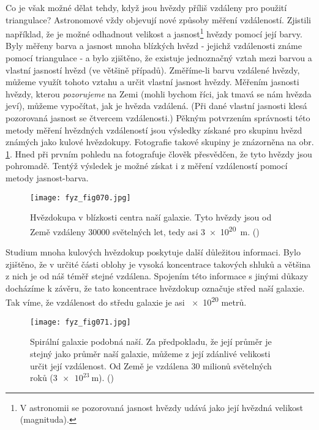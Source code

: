     Co je však možné dělat tehdy, když jsou hvězdy příliš vzdáleny pro použití triangulace? 
    Astronomové vždy objevují nové způsoby měření vzdáleností. Zjistili například, že je možné 
    odhadnout velikost a jasnost\footnote{V astronomii se pozorovaná jasnost hvězdy udává jako její 
    hvězdná velikost (magnituda).} hvězdy pomocí její barvy. Byly měřeny barva a jasnost mnoha 
    blízkých hvězd - jejichž vzdálenosti známe pomocí triangulace - a bylo zjištěno, že existuje 
    jednoznačný vztah mezi barvou a vlastní jasností hvězd (ve většině případů). Změříme-li barvu 
    vzdálené hvězdy, můžeme využít tohoto vztahu a určit vlastní jasnost hvězdy. Měřením jasnosti 
    hvězdy, kterou \emph{pozorujeme} na Zemi (mohli bychom říci, jak tmavá se nám hvězda jeví), 
    můžeme vypočítat, jak je hvězda vzdálená. (Při dané vlastní jasnosti klesá pozorovaná jasnost 
    se čtvercem vzdálenosti.) Pěkným potvrzením správnosti této metody měření hvězdných vzdáleností 
    jsou výsledky získané pro skupinu hvězd známých jako kulové hvězdokupy. Fotografie takové 
    skupiny je znázorněna na obr. \ref{fyz:fig070}. Hned při prvním pohledu na fotografuje člověk 
    přesvědčen, že tyto hvězdy jsou pohromadě. Tentýž výsledek je možné získat i z měření 
    vzdáleností pomocí metody jasnost-barva.

    \begin{figure}[ht!]  %
      \centering
      \texttt{[image: fyz\_fig070.jpg]}
      \caption{Hvězdokupa v blízkosti centra naší galaxie. Tyto hvězdy jsou od Země vzdáleny 
               \num{30000} světelných let, tedy asi \SI{3e20}{\m}. (\cite[s.~72]{Feynman01})}
      \label{fyz:fig070}
    \end{figure}
    
    Studium mnoha kulových hvězdokup poskytuje další důležitou informaci. Bylo zjištěno, že v 
    určité části oblohy je vysoká koncentrace takových shluků a většina z nich je od náš téměř 
    stejné vzdálena. Spojením této informace s jinými důkazy docházíme k závěru, že tato 
    koncentrace hvězdokup označuje střed naší galaxie. Tak víme, že vzdálenost do středu galaxie je 
    asi \num{e20} metrů. 
    

    \begin{figure}[ht!]  %
      \centering
      \texttt{[image: fyz\_fig071.jpg]}
      \caption{Spirální galaxie podobná naší. Za předpokladu, že její průměr je stejný jako průměr 
               naší galaxie, můžeme z její zdánlivé velikosti určit její vzdálenost. Od Země je 
               vzdálena \num{30} milionů světelných roků (\(\SI{3e23}{\m}\)). 
               (\cite[s.~72]{Feynman01})}
      \label{fyz:fig071}
    \end{figure}

